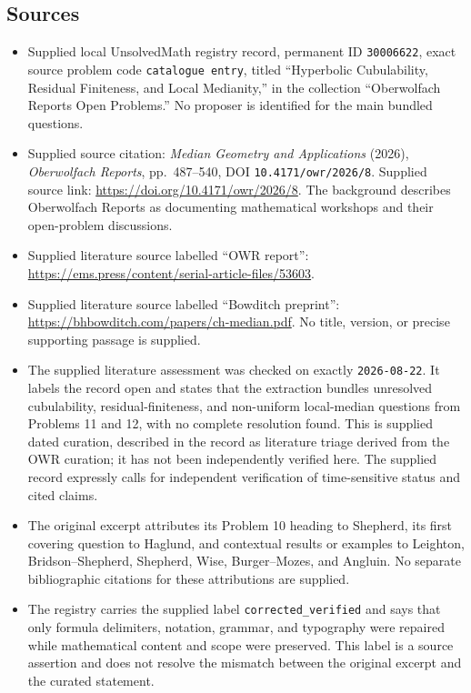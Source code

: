 \documentclass[11pt]{article}
\begin{document}
\subsection{Sources}
\begin{itemize}
\item Supplied local UnsolvedMath registry record, permanent ID \texttt{30006622}, exact source problem code \texttt{catalogue entry}, titled ``Hyperbolic Cubulability, Residual Finiteness, and Local Medianity,'' in the collection ``Oberwolfach Reports Open Problems.'' No proposer is identified for the main bundled questions.
\item Supplied source citation: \emph{Median Geometry and Applications} (2026), \emph{Oberwolfach Reports}, pp.~487--540, DOI \texttt{10.4171/owr/2026/8}. Supplied source link: \url{https://doi.org/10.4171/owr/2026/8}. The background describes Oberwolfach Reports as documenting mathematical workshops and their open-problem discussions.
\item Supplied literature source labelled ``OWR report'': \url{https://ems.press/content/serial-article-files/53603}.
\item Supplied literature source labelled ``Bowditch preprint'': \url{https://bhbowditch.com/papers/ch-median.pdf}. No title, version, or precise supporting passage is supplied.
\item The supplied literature assessment was checked on exactly \texttt{2026-08-22}. It labels the record open and states that the extraction bundles unresolved cubulability, residual-finiteness, and non-uniform local-median questions from Problems 11 and 12, with no complete resolution found. This is supplied dated curation, described in the record as literature triage derived from the OWR curation; it has not been independently verified here. The supplied record expressly calls for independent verification of time-sensitive status and cited claims.
\item The original excerpt attributes its Problem 10 heading to Shepherd, its first covering question to Haglund, and contextual results or examples to Leighton, Bridson--Shepherd, Shepherd, Wise, Burger--Mozes, and Angluin. No separate bibliographic citations for these attributions are supplied.
\item The registry carries the supplied label \texttt{corrected\_verified} and says that only formula delimiters, notation, grammar, and typography were repaired while mathematical content and scope were preserved. This label is a source assertion and does not resolve the mismatch between the original excerpt and the curated statement.
\end{itemize}
\end{document}
